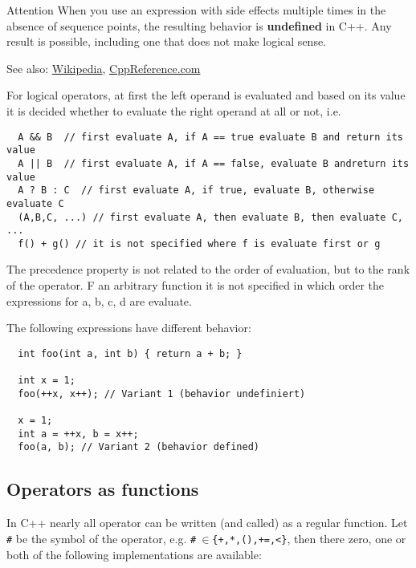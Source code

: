 {\begin{guideline}{Attention}
  When you use an expression with side effects multiple times in the absence of sequence points, the resulting behavior is \textbf{undefined} in C++.
  Any result is possible, including one that does not make logical sense.
\end{guideline}

See also: \href{http://en.wikipedia.org/wiki/Sequence_point}{Wikipedia}, \href{http://en.cppreference.com/w/cpp/language/eval_order}{CppReference.com}

For logical operators, at first the left operand is evaluated and based on its value it is decided whether to evaluate the right operand
at all or not, i.e.
\begin{verbatim}
  A && B  // first evaluate A, if A == true evaluate B and return its value
  A || B  // first evaluate A, if A == false, evaluate B andreturn its value
  A ? B : C  // first evaluate A, if true, evaluate B, otherwise evaluate C
  (A,B,C, ...) // first evaluate A, then evaluate B, then evaluate C, ...
  f() + g() // it is not specified where f is evaluate first or g
\end{verbatim}

\begin{rem}
  The precedence property is not related to the order of evaluation, but to the rank of the operator. F an arbitrary function  it
  is not specified in which order the expressions for a, b, c, d are evaluate.
\end{rem}

\begin{example}
  The following expressions have different behavior:
  \begin{verbatim}
  int foo(int a, int b) { return a + b; }

  int x = 1;
  foo(++x, x++); // Variant 1 (behavior undefiniert)

  x = 1;
  int a = ++x, b = x++;
  foo(a, b); // Variant 2 (behavior defined)
  \end{verbatim}
\end{example}

\subsection{Operators as functions}
In C++ nearly all operator can be written (and called) as a regular function. Let \texttt{\#} be the symbol of the operator, e.g. \texttt{\#$~\in$\{+,*,(),+=,<\}}, then there zero, one or both of the following implementations are available:

}
